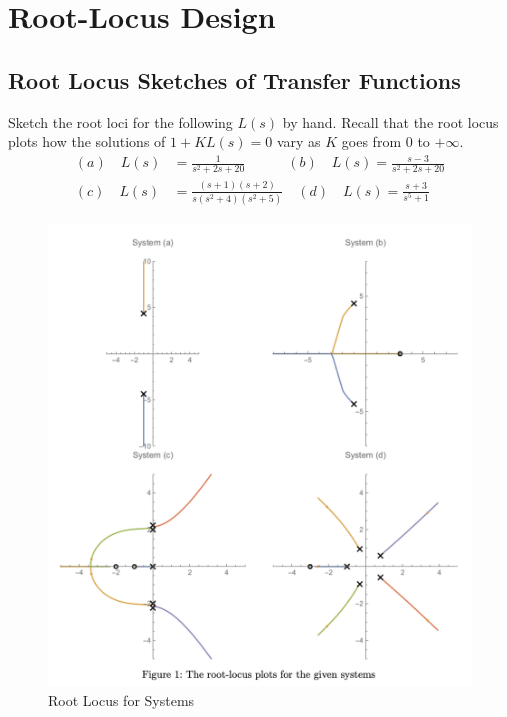\documentclass[12pt]{article}
\begin{document}
\section{Root-Locus Design}
\subsection{Root Locus Sketches of Transfer Functions}

Sketch the root loci for the following $L(s)$ by hand. Recall that the root locus plots how the solutions of $1+K L(s)=0$ vary as $K$ goes from 0 to $+\infty$.
\begin{align*}
    (a) \quad L(s)&=\frac{1}{s^2+2 s+20} \quad \qquad (b) \quad L(s)=\frac{s-3}{s^2+2 s+20} \\
    (c) \quad L(s)&=\frac{(s+1)(s+2)}{s\left(s^2+4\right)\left(s^2+5\right)}  \quad (d) \quad L(s)=\frac{s+3}{s^5+1}
\end{align*}

\begin{figure}[H]
    \centering
    \includegraphics[width=0.55\linewidth]{figs/7.1.png}
    \caption{Root Locus for Systems}
    \label{fig:prb3}
\end{figure}
\end{document}
